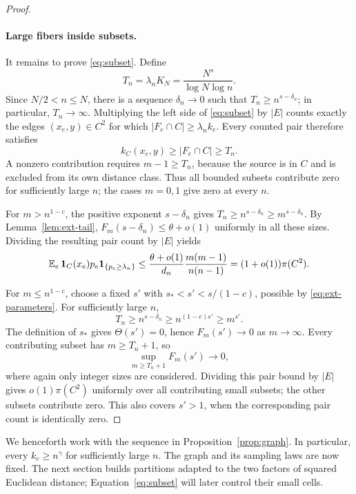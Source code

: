 \begin{proof}
\paragraph{Large fibers inside subsets.}
It remains to prove \eqref{eq:subset}. Define
\[
 T_n=\lambda_nK_N=\frac{N^s}{\log N\log n}.
\]
Since $N/2<n\le N$, there is a sequence $\delta_n\to0$ such that
$T_n\ge n^{s-\delta_n}$; in particular, $T_n\to\infty$.
Multiplying the left side of \eqref{eq:subset} by $|E|$ counts exactly
the edges $(x_e,y)\in C^2$ for which
$|F_e\cap C|\ge\lambda_n k_e$. Every counted pair therefore satisfies
\[
 k_C(x_e,y)\ge |F_e\cap C|\ge T_n.
\]
A nonzero contribution requires $m-1\ge T_n$, because the source is
in $C$ and is excluded from its own distance class. Thus all bounded
subsets contribute zero for sufficiently large $n$; the cases $m=0,1$
give zero at every $n$.

For $m>n^{1-c}$, the positive exponent $s-\delta_n$ gives
$T_n\ge n^{s-\delta_n}\ge m^{s-\delta_n}$. By
Lemma~\ref{lem:ext-tail}, $F_m(s-\delta_n)\le\theta+o(1)$ uniformly
in all these sizes. Dividing the resulting pair count by $|E|$ yields
\[
 \mathbb E_e\,\mathbf 1_C(x_e)p_e\mathbf 1_{\{p_e\ge\lambda_n\}}
 \le\frac{\theta+o(1)}{d_n}
       \frac{m(m-1)}{n(n-1)}
 =(1+o(1))\pi(C^2).
\]

For $m\le n^{1-c}$, choose a fixed $s'$ with
$s_*<s'<s/(1-c)$, possible by \eqref{eq:ext-parameters}.
For sufficiently large $n$,
\[
 T_n\ge n^{s-\delta_n}\ge n^{(1-c)s'}\ge m^{s'}.
\]
The definition of $s_*$ gives $\Theta(s')=0$, hence $F_m(s')\to0$
as $m\to\infty$. Every contributing subset has $m\ge T_n+1$, so
\[
 \sup_{m\ge T_n+1}F_m(s')\longrightarrow0,
\]
where again only integer sizes are considered. Dividing this pair
bound by $|E|$ gives $o(1)\pi(C^2)$ uniformly over all contributing
small subsets; the other subsets contribute zero. This also covers
$s'>1$, when the corresponding pair count is identically zero.
\end{proof}

We henceforth work with the sequence in Proposition~\ref{prop:graph}.
In particular, every $k_e\ge n^\gamma$ for sufficiently large $n$.
The graph and its sampling laws are now fixed. The next section builds
partitions adapted to the two factors of squared Euclidean distance;
Equation~\eqref{eq:subset} will later control their small cells.
